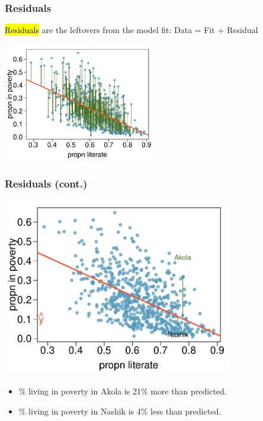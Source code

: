 \documentclass[notes,11pt, aspectratio=169]{beamer}
\begin{document}

\begin{frame}
\frametitle{Residuals}

\hl{Residuals} are the leftovers from the model fit: Data = Fit + Residual

\begin{center}
\includegraphics[width=0.5\textwidth]{graphs/l08f03}
\end{center}

\end{frame}


\begin{frame}
\frametitle{Residuals (cont.)}

\vspace{-0.5cm}
{
\begin{center}
\includegraphics[width=0.75\textwidth]{graphs/l08f04}
\end{center}
}
{
\pause
\begin{itemize}
\item \% living in poverty in Akola is 21\% more than predicted.
\pause
\item \% living in poverty in Nashik is 4\% less than predicted.
\end{itemize}
}


\end{frame}
\end{document}
